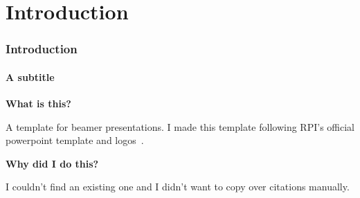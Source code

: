 \documentclass[
	10pt, %
	aspectratio=169, %
]{beamer}
\begin{document}
\section{Introduction}
\begin{frame}
	\frametitle{Introduction} %
	\framesubtitle{A subtitle}
	{
		\Large \bf
		What is this?
	}

	A template for beamer presentations.
	I made this template following RPI's official powerpoint template and logos~\cite{rpiHomeStrategicCommunications}.

	\vspace{1cm}
	{
		\Large \bf
		Why did I do this?
	}

	I couldn't find an existing one and I didn't want to copy over citations manually.

\end{frame}
\end{document}
